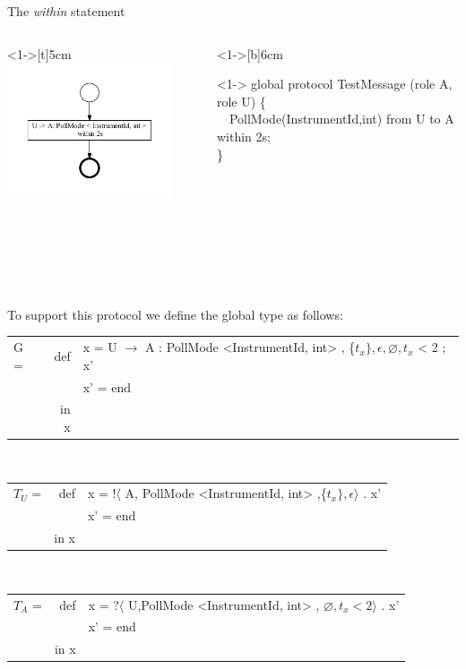 \documentclass[8 pt]{beamer}
\newcommand{\BLUE}{\color[rgb]{0,0,0.69}}
\begin{document}
\begin{frame}{The \emph{within} statement}
\begin{columns}
\begin{column}<1->[t]{5cm}
\includegraphics[height=4cm]{Message}
\end{column}
\begin{column}<1->[b]{6cm}
\begin{exampleblock}<1->{}
{\BLUE global protocol} TestMessage (role A, role U) \{ \\
~~PollMode(InstrumentId,int) {\BLUE from} U {\BLUE to} A {\BLUE within} 2s;\\
\}\\
\end{exampleblock}
~~\\
~~\\
~~\\
~~\\
~~\\
~~\\
\end{column}
\end{columns}
To support this protocol we define the global type as follows:\\
\begin{tabular}{lrl}
G = & def & x = U $\rightarrow$ A : PollMode <InstrumentId, int> , \{$t_{x}\}, \epsilon, \varnothing, t_{x}$ < 2  ;  x’\\
&& x’ = end\\
& in x&\\
\end{tabular}\\
\begin{tabular}{lrl}
$T_{U}$ = & def &  x  = !$\langle$ A, PollMode <InstrumentId, int>  ,\{$t_{x}\},\epsilon \rangle$ . x’\\
&& x’ = end\\
& in x&\\
\end{tabular}\\
\begin{tabular}{lrl}
$T_{A}$ = & def &  x  = ?$\langle$ U,PollMode <InstrumentId, int>  , $\varnothing, t_{x} < 2 \rangle$ . x’\\
&& x’ = end\\
& in x&\\
\end{tabular}\\
\end{frame}
\end{document}
